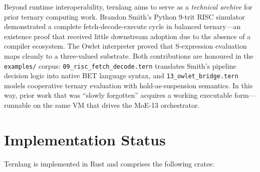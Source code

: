 \documentclass[journal,10pt,twocolumn]{IEEEtran}
\begin{document}
Beyond runtime interoperability, ternlang aims to serve as a
\emph{technical archive} for prior ternary computing work.
Brandon Smith's Python 9-trit RISC simulator demonstrated a complete
fetch-decode-execute cycle in balanced ternary—an existence proof that
received little downstream adoption due to the absence of a compiler
ecosystem. The Owlet interpreter proved that S-expression evaluation maps
cleanly to a three-valued substrate. Both contributions are honoured in
the \texttt{examples/} corpus: \texttt{09\_risc\_fetch\_decode.tern}
translates Smith's pipeline decision logic into native BET language syntax,
and \texttt{13\_owlet\_bridge.tern} models cooperative ternary evaluation
with hold-as-suspension semantics. In this way, prior work that was
``slowly forgotten'' acquires a working executable form—runnable on the
same VM that drives the MoE-13 orchestrator.

\section{Implementation Status}
\label{sec:status}

Ternlang is implemented in Rust and comprises the following crates:
\end{document}
